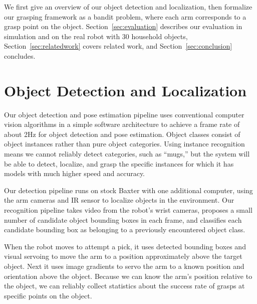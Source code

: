 \documentclass{article}
\begin{document}
We first give an overview of our object detection and localization,
then formalize our grasping framework as a bandit problem, where each
arm corresponds to a grasp point on the object.
Section~\ref{sec:evaluation} describes our evaluation in simulation
and on the real robot with $30$ household objects,
Section~\ref{sec:relatedwork} covers related work, and
Section~\ref{sec:conclusion} concludes.



\section{Object Detection and Localization}
Our object detection and pose estimation pipeline uses conventional
computer vision algorithms in a simple software architecture to
achieve a frame rate of about 2Hz for object detection and pose
estimation.  Object classes consist of object instances rather than
pure object categories.  Using instance recognition means we cannot
reliably detect categories, such as ``mugs,'' but the system will be
able to detect, localize, and grasp the specific instances for which
it has models with much higher speed and accuracy.

Our detection pipeline runs on stock Baxter with one additional
computer, using the arm cameras and IR sensor to localize objects in
the environment.  Our recognition pipeline takes video from the
robot's wrist cameras, proposes a small number of candidate object
bounding boxes in each frame, and classifies each candidate bounding
box as belonging to a previously encountered object class.

When the robot moves to attempt a pick, it uses detected bounding
boxes and visual servoing to move the arm to a position approximately
above the target object. Next it uses image gradients to servo the arm
to a known position and orientation above the object. Because we can
know the arm's position relative to the object, we can reliably
collect statistics about the success rate of grasps at specific points
on the object.
\end{document}
